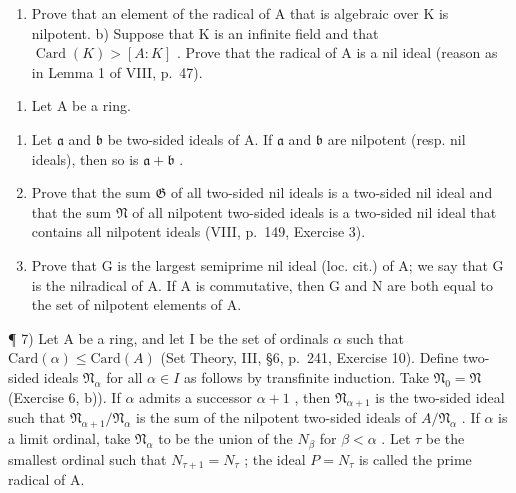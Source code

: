 \begin{enumerate}
\def\labelenumi{\alph{enumi})}
\tightlist
\item
  Prove that an element of the radical of A that is algebraic over K is nilpotent. b) Suppose that K is an infinite field and that \(\operatorname{Card}(K) > [A : K]\) . Prove that the radical of A is a nil ideal (reason as in Lemma 1 of VIII, p.~47).
\end{enumerate}

\begin{enumerate}
\def\labelenumi{\arabic{enumi})}
\setcounter{enumi}{5}
\tightlist
\item
  Let \(\mathrm{A}\) be a ring.
\end{enumerate}

\begin{enumerate}
\def\labelenumi{\alph{enumi})}
\item
  Let \(\mathfrak{a}\) and \(\mathfrak{b}\) be two-sided ideals of A. If \(\mathfrak{a}\) and \(\mathfrak{b}\) are nilpotent (resp. nil ideals), then so is \(\mathfrak{a} + \mathfrak{b}\) .
\item
  Prove that the sum \(\mathfrak{G}\) of all two-sided nil ideals is a two-sided nil ideal and that the sum \(\mathfrak{N}\) of all nilpotent two-sided ideals is a two-sided nil ideal that contains all nilpotent ideals (VIII, p.~149, Exercise 3).
\item
  Prove that G is the largest semiprime nil ideal (loc. cit.) of A; we say that G is the nilradical of A. If A is commutative, then G and N are both equal to the set of nilpotent elements of A.
\end{enumerate}

¶ 7) Let A be a ring, and let I be the set of ordinals \(\alpha\) such that \(\text{Card}(\alpha) \leqslant \text{Card}(A)\) (Set Theory, III, §6, p.~241, Exercise 10). Define two-sided ideals \(\mathfrak{N}_{\alpha}\) for all \(\alpha \in I\) as follows by transfinite induction. Take \(\mathfrak{N}_0 = \mathfrak{N}\) (Exercise 6, b)). If \(\alpha\) admits a successor \(\alpha + 1\) , then \(\mathfrak{N}_{\alpha+1}\) is the two-sided ideal such that \(\mathfrak{N}_{\alpha+1}/\mathfrak{N}_{\alpha}\) is the sum of the nilpotent two-sided ideals of \(A/\mathfrak{N}_{\alpha}\) . If \(\alpha\) is a limit ordinal, take \(\mathfrak{N}_{\alpha}\) to be the union of the \(N_{\beta}\) for \(\beta < \alpha\) . Let \(\tau\) be the smallest ordinal such that \(N_{\tau+1} = N_{\tau}\) ; the ideal \(P = N_{\tau}\) is called the prime radical of A.

